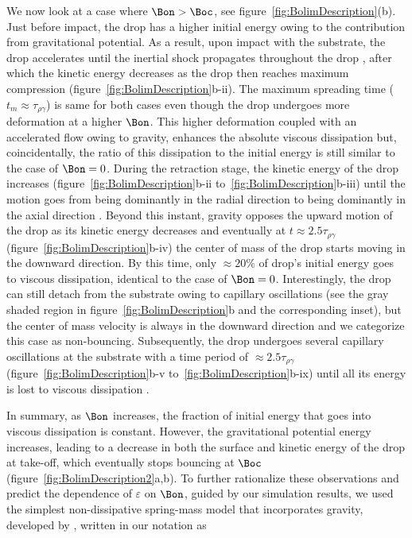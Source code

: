 We now look at a case where $\Bon > \Boc$, see figure~\ref{fig:BolimDescription}(b). Just before impact, the drop has a higher initial energy owing to the contribution from gravitational potential. As a result, upon impact with the substrate, the drop accelerates until the inertial shock propagates throughout the drop \citep[see figure~\ref{fig:BolimDescription}b-i and][]{Gordillo2018, cheng2021drop}, after which the kinetic energy decreases as the drop then reaches maximum compression (figure~\ref{fig:BolimDescription}b-ii). The maximum spreading time ($t_m \approx \tau_{\rho\gamma}$) is same for both cases even though the drop undergoes more deformation at a higher $\Bon$. This higher deformation coupled with an accelerated flow owing to gravity, enhances the absolute viscous dissipation but, coincidentally, the ratio of this dissipation to the initial energy is still similar to the case of $\Bon = 0$. During the retraction stage, the kinetic energy of the drop increases (figure~\ref{fig:BolimDescription}b-ii to~\ref{fig:BolimDescription}b-iii) until the motion goes from being dominantly in the radial direction to being dominantly in the axial direction \citep[figure~\ref{fig:BolimDescription}b-iii, $t \approx 1.5\tau_{\rho\gamma}$, see][]{chantelot2018rebonds, zhang2022impact}. Beyond this instant, gravity opposes the upward motion of the drop as its kinetic energy decreases and eventually at $t \approx 2.5\tau_{\rho\gamma}$ (figure~\ref{fig:BolimDescription}b-iv) the center of mass of the drop starts moving in the downward direction. By this time, only $\approx 20\%$ of drop's initial energy goes to viscous dissipation, identical to the case of $\Bon = 0$. Interestingly, the drop can still detach from the substrate owing to capillary oscillations (see the gray shaded region in figure~\ref{fig:BolimDescription}b and the corresponding inset), but the center of mass velocity is always in the downward direction and we categorize this case as non-bouncing. Subsequently, the drop undergoes several capillary oscillations at the substrate with a time period of $\approx 2.5\tau_{\rho\gamma}$ (figure~\ref{fig:BolimDescription}b-v to~\ref{fig:BolimDescription}b-ix) until all its energy is lost to viscous dissipation \citep{biance2006}. 

In summary, as $\Bon$ increases, the fraction of initial energy that goes into viscous dissipation is constant. However, the gravitational potential energy increases, leading to a decrease in both the surface and kinetic energy of the drop at take-off, which eventually stops bouncing at $\Boc$ (figure~\ref{fig:BolimDescription2}a,b). To further rationalize these observations and predict the dependence of $\varepsilon$ on $\Bon$, guided by our simulation results, we used the simplest non-dissipative spring-mass model that incorporates gravity, developed by \citet{biance2006}, written in our notation as

